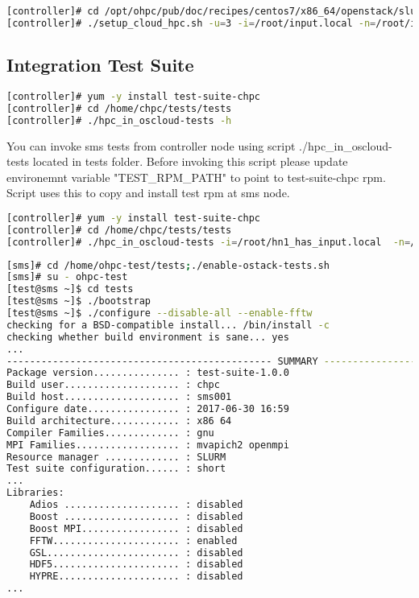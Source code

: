 \begin{lstlisting}[language=bash,keywords={},upquote=true]
[controller]# cd /opt/ohpc/pub/doc/recipes/centos7/x86_64/openstack/slurm/
[controller]# ./setup_cloud_hpc.sh -u=3 -i=/root/input.local -n=/root/inventory
\end{lstlisting}

\newpage
\subsection{Integration Test Suite}
	


\begin{lstlisting}[language=bash,keywords={},upquote=true]
[controller]# yum -y install test-suite-chpc
[controller]# cd /home/chpc/tests/tests
[controller]# ./hpc_in_oscloud-tests -h
\end{lstlisting}
You can invoke sms tests from controller node using script ./hpc\_in\_oscloud-tests located in tests folder. Before invoking this script please update environemnt variable "TEST\_RPM\_PATH" to point to test-suite-chpc rpm. Script uses this to copy and install test rpm at sms node.

\begin{lstlisting}[language=bash,keywords={},upquote=true]
[controller]# yum -y install test-suite-chpc
[controller]# cd /home/chpc/tests/tests
[controller]# ./hpc_in_oscloud-tests -i=/root/hn1_has_input.local  -n=/root/hn1_has_inventory -rs
\end{lstlisting}



\begin{lstlisting}[language=bash,keywords={},upquote=true]
[sms]# cd /home/ohpc-test/tests;./enable-ostack-tests.sh 
[sms]# su - ohpc-test
[test@sms ~]$ cd tests 
[test@sms ~]$ ./bootstrap
[test@sms ~]$ ./configure --disable-all --enable-fftw 
checking for a BSD-compatible install... /bin/install -c 
checking whether build environment is sane... yes 
... 
---------------------------------------------- SUMMARY --------------------------------------------
Package version............... : test-suite-1.0.0
Build user.................... : chpc
Build host.................... : sms001 
Configure date................ : 2017-06-30 16:59
Build architecture............ : x86 64 
Compiler Families............. : gnu 
MPI Families.................. : mvapich2 openmpi 
Resource manager ............. : SLURM 
Test suite configuration...... : short 
... 
Libraries: 
	Adios .................... : disabled 
	Boost .................... : disabled 
	Boost MPI................. : disabled 
	FFTW...................... : enabled 
	GSL....................... : disabled 
	HDF5...................... : disabled 
	HYPRE..................... : disabled 
...
\end{lstlisting}
	
